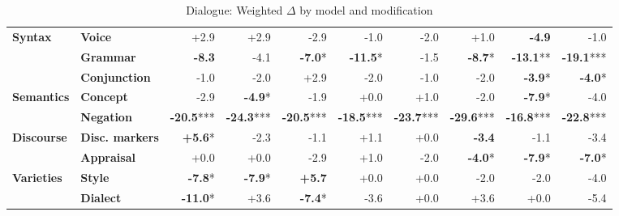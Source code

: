 \begin{table}[h]
{\begin{tabular}{llrrrrrrrr}
\midrule
\textbf{Syntax} & \textbf{Voice} & \cellcolor{green!5} +2.9 & \cellcolor{green!5} +2.9 & \cellcolor{red!5} -2.9 & \cellcolor{red!1} -1.0 & \cellcolor{red!3} -2.0 & \cellcolor{green!1} +1.0 & \cellcolor{red!9} \textbf{-4.9} & \cellcolor{red!1} -1.0 \\
  & \textbf{Grammar} & \cellcolor{red!16} \textbf{-8.3} & \cellcolor{red!8} -4.1 & \cellcolor{red!13} \textbf{-7.0}* & \cellcolor{red!20} \textbf{-11.5}* & \cellcolor{red!2} -1.5 & \cellcolor{red!17} \textbf{-8.7}* & \cellcolor{red!20} \textbf{-13.1}** & \cellcolor{red!20} \textbf{-19.1}*** \\
  & \textbf{Conjunction} & \cellcolor{red!1} -1.0 & \cellcolor{red!3} -2.0 & \cellcolor{green!5} +2.9 & \cellcolor{red!3} -2.0 & \cellcolor{red!1} -1.0 & \cellcolor{red!3} -2.0 & \cellcolor{red!7} \textbf{-3.9}* & \cellcolor{red!7} \textbf{-4.0}* \\
\midrule
\textbf{Semantics} & \textbf{Concept} & \cellcolor{red!5} -2.9 & \cellcolor{red!9} \textbf{-4.9}* & \cellcolor{red!3} -1.9 & \cellcolor{red!0} +0.0 & \cellcolor{green!1} +1.0 & \cellcolor{red!3} -2.0 & \cellcolor{red!15} \textbf{-7.9}* & \cellcolor{red!7} -4.0 \\
  & \textbf{Negation} & \cellcolor{red!20} \textbf{-20.5}*** & \cellcolor{red!20} \textbf{-24.3}*** & \cellcolor{red!20} \textbf{-20.5}*** & \cellcolor{red!20} \textbf{-18.5}*** & \cellcolor{red!20} \textbf{-23.7}*** & \cellcolor{red!20} \textbf{-29.6}*** & \cellcolor{red!20} \textbf{-16.8}*** & \cellcolor{red!20} \textbf{-22.8}*** \\
\midrule
\textbf{Discourse} & \textbf{Disc. markers} & \cellcolor{green!11} \textbf{+5.6}* & \cellcolor{red!4} -2.3 & \cellcolor{red!2} -1.1 & \cellcolor{green!2} +1.1 & \cellcolor{red!0} +0.0 & \cellcolor{red!6} \textbf{-3.4} & \cellcolor{red!2} -1.1 & \cellcolor{red!6} -3.4 \\
  & \textbf{Appraisal} & \cellcolor{red!0} +0.0 & \cellcolor{red!0} +0.0 & \cellcolor{red!5} -2.9 & \cellcolor{green!1} +1.0 & \cellcolor{red!3} -2.0 & \cellcolor{red!7} \textbf{-4.0}* & \cellcolor{red!15} \textbf{-7.9}* & \cellcolor{red!13} \textbf{-7.0}* \\
\midrule
\textbf{Varieties} & \textbf{Style} & \cellcolor{red!15} \textbf{-7.8}* & \cellcolor{red!15} \textbf{-7.9}* & \cellcolor{green!11} \textbf{+5.7} & \cellcolor{red!0} +0.0 & \cellcolor{red!0} +0.0 & \cellcolor{red!3} -2.0 & \cellcolor{red!3} -2.0 & \cellcolor{red!7} -4.0 \\
  & \textbf{Dialect} & \cellcolor{red!20} \textbf{-11.0}* & \cellcolor{green!7} +3.6 & \cellcolor{red!14} \textbf{-7.4}* & \cellcolor{red!7} -3.6 & \cellcolor{red!0} +0.0 & \cellcolor{green!7} +3.6 & \cellcolor{red!0} +0.0 & \cellcolor{red!10} -5.4 \\
\bottomrule
\end{tabular}}
\caption{Dialogue: Weighted $\Delta$ by model and modification}\label{tab:dialogue_delta}
\end{table}